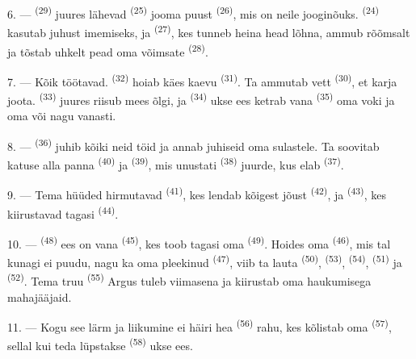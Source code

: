 6. ---  \textsuperscript{(29)} juures lähevad 
\textsuperscript{(25)} jooma puust  \textsuperscript{(26)}, mis on neile
jooginõuks.  \textsuperscript{(24)} kasutab juhust imemiseks, ja
 \textsuperscript{(27)}, kes tunneb heina head lõhna, ammub rõõmsalt ja
tõstab uhkelt pead oma võimsate  \textsuperscript{(28)}.

7. --- Kõik töötavad.  \textsuperscript{(32)} hoiab käes kaevu
 \textsuperscript{(31)}. Ta ammutab vett 
\textsuperscript{(30)}, et karja joota.  \textsuperscript{(33)} juures
riisub mees õlgi, ja  \textsuperscript{(34)} ukse ees ketrab vana
 \textsuperscript{(35)} oma voki ja oma 
 või  nagu vanasti.

\VUsaut{3.0mm}
\VUsaut{3.0mm}

8. ---  \textsuperscript{(36)} juhib kõiki neid töid ja annab juhiseid
oma sulastele. Ta soovitab katuse alla panna  \textsuperscript{(40)} ja
 \textsuperscript{(39)}, mis unustati 
\textsuperscript{(38)} juurde, kus elab  \textsuperscript{(37)}.

9. --- Tema hüüded hirmutavad  \textsuperscript{(41)}, kes lendab kõigest
jõust  \textsuperscript{(42)}, ja 
\textsuperscript{(43)}, kes kiirustavad tagasi  \textsuperscript{(44)}.

10. ---  \textsuperscript{(48)} ees on vana 
\textsuperscript{(45)}, kes toob tagasi oma  \textsuperscript{(49)}.
Hoides oma  \textsuperscript{(46)}, mis tal kunagi ei puudu, nagu ka
oma pleekinud  \textsuperscript{(47)}, viib ta lauta 
\textsuperscript{(50)},  \textsuperscript{(53)}, 
\textsuperscript{(54)},  \textsuperscript{(51)} ja 
\textsuperscript{(52)}. Tema truu  \textsuperscript{(55)} Argus tuleb
viimasena ja kiirustab oma haukumisega mahajääjaid.

11. --- Kogu see lärm ja liikumine ei häiri hea 
\textsuperscript{(56)} rahu, kes kõlistab oma  \textsuperscript{(57)}, sellal
kui teda lüpstakse  \textsuperscript{(58)} ukse ees.

